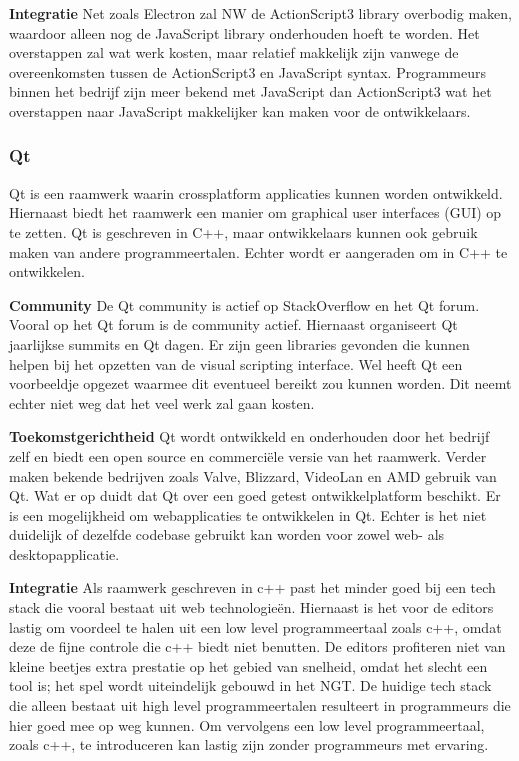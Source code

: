 \textbf{Integratie}
Net zoals Electron zal NW de ActionScript3 library overbodig maken, waardoor alleen nog de JavaScript library onderhouden hoeft te worden. Het overstappen zal wat werk kosten, maar relatief makkelijk zijn vanwege de overeenkomsten tussen de ActionScript3 en JavaScript syntax.
Programmeurs binnen het bedrijf zijn meer bekend met JavaScript dan ActionScript3 wat het overstappen naar JavaScript makkelijker kan maken voor de ontwikkelaars.

\pagebreak
\subsubsection{Qt}
Qt is een raamwerk waarin crossplatform applicaties kunnen worden ontwikkeld. Hiernaast biedt het raamwerk een manier om graphical user interfaces (GUI) op te zetten\cite{Qt}. Qt is geschreven in C++, maar ontwikkelaars kunnen ook gebruik maken van andere programmeertalen\cite{QtLanguageBindings}. Echter wordt er aangeraden om in C++ te ontwikkelen.

\textbf{Community}
De Qt community is actief op StackOverflow\cite{StackOverflowQtQuestions} en het Qt forum\cite{QtForum}. Vooral op het Qt forum is de community actief. Hiernaast organiseert Qt jaarlijkse summits en Qt dagen.  
Er zijn geen libraries gevonden die kunnen helpen bij het opzetten van de visual scripting interface. Wel heeft Qt een voorbeeldje opgezet waarmee dit eventueel bereikt zou kunnen worden\cite{QtDiagramExample}. Dit neemt echter niet weg dat het veel werk zal gaan kosten.

\textbf{Toekomstgerichtheid}
Qt wordt ontwikkeld en onderhouden door het bedrijf zelf en biedt een open source en commerciële versie van het raamwerk\cite{QtLicense}. Verder maken bekende bedrijven zoals Valve\cite{ValveQt}, Blizzard\cite{BlizzardQt}, VideoLan\cite{VideoLanQt} en AMD\cite{AMDQt} gebruik van Qt. Wat er op duidt dat Qt over een goed getest ontwikkelplatform beschikt.
Er is een mogelijkheid om webapplicaties te ontwikkelen in Qt\cite{QtWebKit}\cite{QtCutelyst}\cite{WtQt}. Echter is het niet duidelijk of dezelfde codebase gebruikt kan worden voor zowel web- als desktopapplicatie.

\textbf{Integratie}
Als raamwerk geschreven in c++ past het minder goed bij een tech stack die vooral bestaat uit web technologieën. Hiernaast is het voor de editors lastig om voordeel te halen uit een low level programmeertaal zoals c++, omdat deze de fijne controle die c++ biedt niet benutten. De editors profiteren niet van kleine beetjes extra prestatie op het gebied van snelheid, omdat het slecht een tool is; het spel wordt uiteindelijk gebouwd in het NGT.
De huidige tech stack die alleen bestaat uit high level programmeertalen resulteert in programmeurs die hier goed mee op weg kunnen. Om vervolgens een low level programmeertaal, zoals c++, te introduceren kan lastig zijn zonder programmeurs met ervaring.


